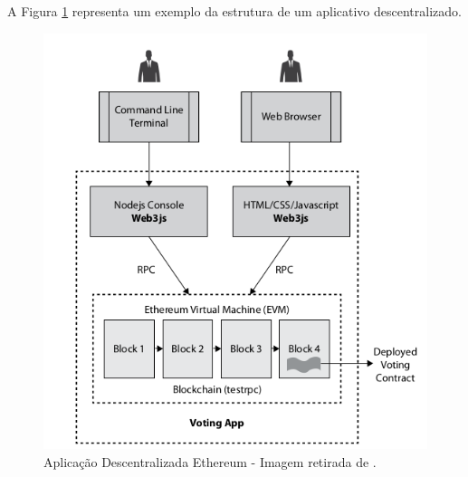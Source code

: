 A Figura \ref{fig:dapp_ethereum} representa um exemplo da estrutura de um aplicativo descentralizado.

    \begin{figure}[h]
         \centering
         \includegraphics[scale=0.5]{figuras/capitulo_2/ethereum_dapp_structure.png}
         \caption{Aplicação Descentralizada Ethereum - Imagem retirada de \cite{blockchain_pratical_guide}.}
         \label{fig:dapp_ethereum}
    \end{figure}